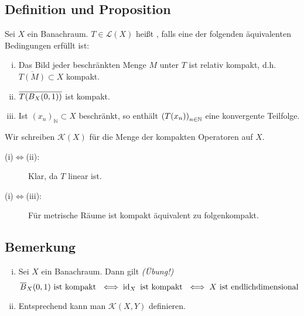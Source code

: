\subsection[Definition und Proposition: Kompakte Operatoren]{Definition und Proposition} %
\label{sub:87}
Sei $X$ ein Banachraum. $T \in \mathcal{L}(X)$ heißt , falls eine der folgenden äquivalenten Bedingungen erfüllt ist:
\begin{enumerate}[(i)]
	\item Das Bild jeder beschränkten Menge $M$ unter $T$ ist relativ kompakt, d.h. $\overline{T(M)} \subset X$ kompakt.
	\item $\overline{T \enbrace*{B_X(0,1)}}$ ist kompakt. 
	\item Ist $(x_n)_\mathds{N} \subset X$ beschränkt, so enthält $\enbrace*{T(x_n)}_{n \in \mathds{N}}$ eine konvergente Teilfolge.
\end{enumerate}
Wir schreiben $\mathcal{K}(X)$ für die Menge der kompakten Operatoren auf $X$.
\begin{description}
	\item[(i)$\Leftrightarrow$(ii):] Klar, da $T$ linear ist.
	\item[(i)$\Leftrightarrow$(iii):] Für metrische Räume ist kompakt äquivalent zu folgenkompakt. \bewende
\end{description}

\subsection[Bemerkung zu kompakten Operatoren]{Bemerkung} %
\label{sub:88}
\begin{enumerate}[(i)]
	\item Sei $X$ ein Banachraum. Dann gilt \hfill \emph{(Übung!)}
	\[
		\overline{B}_X(0,1) \text{ ist kompakt } \iff \id_X \text{ ist kompakt } \iff X \text{ ist endlichdimensional}
	\]
	\item Entsprechend kann man $\mathcal{K}(X,Y)$ definieren.
\end{enumerate}

